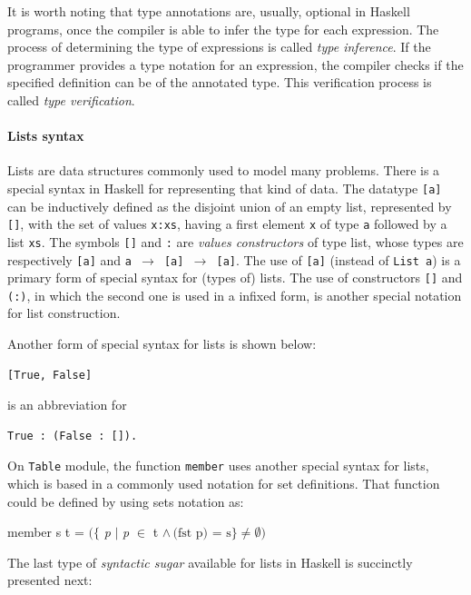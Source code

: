 \documentclass[oneside,12pt]{scrbook}
\theoremstyle{definition}
\theoremstyle{plain}
\theoremstyle{definition}
\begin{document}
It is worth noting that type annotations are, usually, optional in Haskell programs, once the compiler is able to infer the type for each expression. The process of determining the type of expressions is called \emph{type inference}. If the programmer provides a type notation for an expression, the compiler checks if the specified definition can be of the annotated type. This verification process is called \emph{type verification}.

\paragraph{Lists syntax}

Lists are data structures commonly used to model many problems. There is a special syntax in Haskell for representing that kind of data. The datatype \texttt{[a]} can be inductively defined as the disjoint union of an empty list, represented by  \texttt{[]}, with the set of values \texttt{x:xs}, having a first element \texttt{x} of type \texttt{a} followed by a list \texttt{xs}. The symbols \texttt{[]} and \texttt{:} are \emph{values constructors} of type list, whose types are respectively \texttt{[a]} and \texttt{a $\rightarrow$ [a] $\rightarrow$ [a]}. The use of \texttt{[a]} (instead of \texttt{List a}) is a primary form of special syntax for (types of) lists. The use of constructors \texttt{[]} and \texttt{(:)}, in which the second one is used in a infixed form, is another special notation for list construction.

Another form of special syntax for lists is shown below:

\begin{verbatim} 
[True, False] 
\end{verbatim}
is an abbreviation for
\begin{verbatim} 
True : (False : []). 
\end{verbatim}

On \texttt{Table} module, the function \texttt{member} uses another special syntax for lists, which is based in a commonly used notation for set definitions. That function could be defined by using sets notation as:

\begin{center}
	member s t = $(\{$ \emph{p} $|$ \emph{p} $\in$ t $\land\,\text{(fst p) = s}\} \neq \emptyset)$\\   
\end{center}

The last type of \emph{syntactic sugar} available for lists in Haskell is succinctly presented next:
\end{document}
